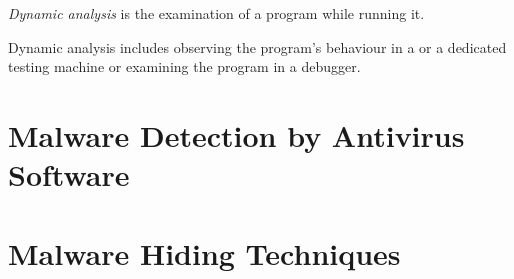 \begin{definition}
\emph{Dynamic analysis} is the examination of a program while running it. \cite[]{sikorski12}
\end{definition}

Dynamic analysis includes \eg{} observing the program's behaviour in a \VM{} or a dedicated testing machine or examining the program in a debugger.

\section{Malware Detection by Antivirus Software}

\section{Malware Hiding Techniques}
